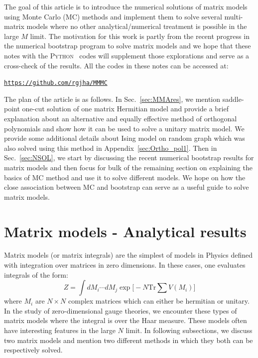 \documentclass[11pt]{article}
\newcommand{\PY}{\textsc{Python}}
\begin{document}
The goal of this article is to introduce the numerical solutions of matrix models using Monte Carlo (MC) methods and implement them to solve several multi-matrix 
models where no other analytical/numerical treatment is possible in the large $M$ limit. The motivation for this work is partly from the recent progress in the numerical bootstrap program to 
solve matrix models and we hope that these notes with the \PY~ codes will supplement
those explorations and serve as a cross-check of the results. All the codes in these notes can be accessed at:  
\begin{center} \texttt{\href{https://github.com/rgjha/MMMC}{https://github.com/rgjha/MMMC}} \end{center}
The plan of the article is as follows. In Sec.~\ref{sec:MMAres}, we mention saddle-point one-cut solution 
of one matrix Hermitian model and provide a brief explanation about an alternative and equally effective
method of orthogonal polynomials and show how it can be used to 
solve a unitary matrix model. We provide some additional details about Ising model on random graph 
which was also solved using this method in Appendix~\ref{sec:Ortho_pol1}. 
Then in Sec.~\ref{sec:NSOL}, we start by discussing the recent 
numerical bootstrap results for matrix models and then focus for bulk of the 
remaining section on explaining the basics of MC method and use it to solve different models. 
We hope on how the close association between MC 
and bootstrap can serve as a useful guide to solve matrix models. 


\section{\label{sec:MMAres}Matrix models - Analytical results} 
Matrix models (or matrix integrals) are the simplest of models in Physics 
defined with integration over matrices in zero dimensions. 
In these cases, one evaluates integrals of the form:
\begin{equation}
Z = \int dM_{i} \cdots dM_{j} \exp\Bigg[-N \mathrm{Tr} \sum V(M_{i})\Bigg] 
\end{equation}
where $M_{i}$ are $N \times N$ complex matrices which can either be hermitian or unitary.  
In the study of zero-dimensional gauge theories, we encounter these types of matrix models 
where the integral is over the Haar measure. These models often have interesting features in the 
large $N$ limit. In following subsections, we discuss two matrix models and mention two different methods in which they both can be respectively solved.
\end{document}
